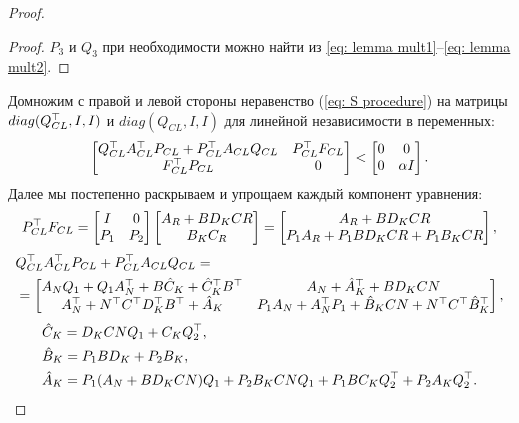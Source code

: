 \begin{proof}
\begin{proof}
		${P}_3$ и ${Q}_3$ при необходимости можно найти из \eqref{eq: lemma mult1}--\eqref{eq: lemma mult2}.
	\end{proof}
	Домножим с правой и левой стороны неравенство (\ref{eq: S procedure}) на матрицы $diag({Q}_{CL}^\top, {I}, {I})$ и $diag({Q}_{CL}, {I}, {I})$ для линейной независимости в переменных:
	\begin{align}
		\begin{bmatrix}
			{Q}_{CL}^\top{A}_{CL}^\top {P}_{CL} + {P}_{CL}^\top{A}_{CL}{Q}_{CL} & {P}_{CL}^\top{F}_{CL} \\
			{F}_{CL}^\top{P}_{CL} & 0
		\end{bmatrix} < 
		\begin{bmatrix}
			0 & 0\\
			0 & \alpha {I}
		\end{bmatrix}.
	\end{align}
	Далее мы постепенно раскрываем и упрощаем каждый компонент уравнения:
	\begin{align}
		{P}_{CL}^\top{F}_{CL} = \begin{bmatrix}
			{I} & 0 \\
			{P}_{1} & {P}_{2}
		\end{bmatrix}
		\begin{bmatrix}
			{A}_R + {B}{D}_K{C}{R}\\ {B}_K{C}_R
		\end{bmatrix} =
		\begin{bmatrix}
			{A}_R + {B}{D}_K{C}{R}\\
			{P}_{1}{A}_R + {P}_{1}{B}{D}_K{C}{R}+{P}_1{B}_K{C}{R}
		\end{bmatrix},
	\end{align}
	\begin{align}
		&{Q}_{CL}^\top{A}_{CL}^\top {P}_{CL} + {P}_{CL}^\top{A}_{CL}{Q}_{CL} = \nonumber \\
		& = \begin{bmatrix}
			{A}_N{Q}_{1} +{Q}_{1}{A}_N^\top + {B}{\hat{C}}_K +{\hat{C}}_K^\top{B}^\top & {A}_N + {\hat{A}}_K^\top +{B}{D}_K{C}{N}\\
			{A}_N^\top + {N}^\top{C}^\top{D}_K^\top{B}^\top+{\hat{A}}_K & {P}_{1}{A}_N +{A}_N^\top{P}_{1}+{\hat{B}}_K{C}{N}+{N}^\top{C}^\top{\hat{B}}_K^\top
		\end{bmatrix},   
	\end{align}
	\begin{align}
		&{\hat{C}}_K= {D}_K{C}{N}{Q}_{1} + {C}_K{Q}_{2}\T,\\
		&{\hat{B}}_K = {P}_{1}{B}{D}_K + {P}_{2}{B}_K,\\
		&{\hat{A}}_K = {P}_{1}({A}_N+{B}{D}_K{C}{N}){Q}_{1}+{P}_{2}{B}_K{C}{N}{Q}_{1}+{P}_{1}{B}{C}_K{Q}_{2}\T+{P}_{2}{A}_K{Q}_{2}\T.

\end{align}
\end{proof}
